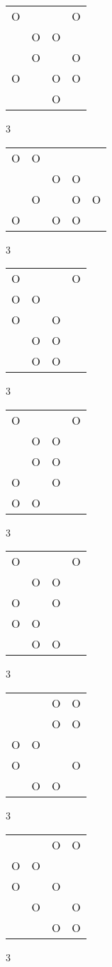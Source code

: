 \begin{tabular}{|m{0.2cm}m{0.2cm}m{0.2cm}m{0.2cm}|}\hline
O& & &O\\
 &O&O& \\
 &O& &O\\
O& &O&O\\
 & &O& \\
\hline\end{tabular}3
\begin{tabular}{|m{0.2cm}m{0.2cm}m{0.2cm}m{0.2cm}m{0.2cm}|}\hline
O&O& & & \\
 & &O&O& \\
 &O& &O&O\\
O& &O&O& \\
\hline\end{tabular}3
\begin{tabular}{|m{0.2cm}m{0.2cm}m{0.2cm}m{0.2cm}|}\hline
O& & &O\\
O&O& & \\
O& &O& \\
 &O&O& \\
 &O&O& \\
\hline\end{tabular}3
\begin{tabular}{|m{0.2cm}m{0.2cm}m{0.2cm}m{0.2cm}|}\hline
O& & &O\\
 &O&O& \\
 &O&O& \\
O& &O& \\
O&O& & \\
\hline\end{tabular}3
\begin{tabular}{|m{0.2cm}m{0.2cm}m{0.2cm}m{0.2cm}|}\hline
O& & &O\\
 &O&O& \\
O& &O& \\
O&O& & \\
 &O&O& \\
\hline\end{tabular}3
\begin{tabular}{|m{0.2cm}m{0.2cm}m{0.2cm}m{0.2cm}|}\hline
 & &O&O\\
 & &O&O\\
O&O& & \\
O& & &O\\
 &O&O& \\
\hline\end{tabular}3
\begin{tabular}{|m{0.2cm}m{0.2cm}m{0.2cm}m{0.2cm}|}\hline
 & &O&O\\
O&O& & \\
O& &O& \\
 &O& &O\\
 & &O&O\\
\hline\end{tabular}3
